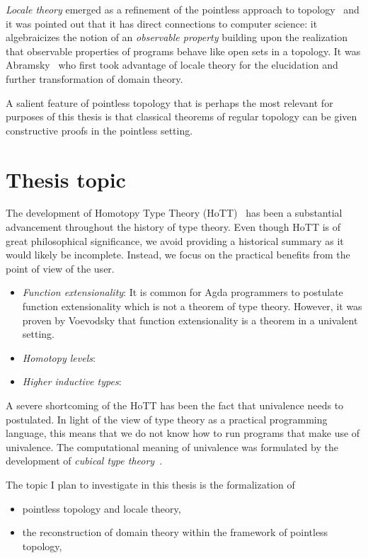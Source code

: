 \documentclass[11pt]{article}
\begin{document}
\emph{Locale theory} emerged as a refinement of the pointless approach to topology~\cite{%
johnstone:1982} and it was pointed out that it has direct connections to computer
science: it algebraicizes the notion of an \emph{observable property} building upon the
realization that observable properties of programs behave like open sets in a topology. It
was Abramsky~\cite{abramsky:1991} who first took advantage of locale theory for the
elucidation and further transformation of domain theory.

A salient feature of pointless topology that is perhaps the most relevant for purposes of
this thesis is that classical theorems of regular topology can be given constructive
proofs in the pointless setting.

\section{Thesis topic}

The development of Homotopy Type Theory (HoTT)~\cite{hottbook} has been a substantial
advancement throughout the history of type theory. Even though HoTT is of great
philosophical significance, we avoid providing a historical summary as it would likely be
incomplete. Instead, we focus on the practical benefits from the point of view of the
user.

\begin{itemize}
  \item \emph{Function extensionality}: It is common for Agda programmers to postulate
    function extensionality which is not a theorem of type theory. However, it was proven
    by Voevodsky that function extensionality is a theorem in a univalent setting.
  \item \emph{Homotopy levels}:
  \item \emph{Higher inductive types}:
\end{itemize}

A severe shortcoming of the HoTT has been the fact that univalence needs to postulated. In
light of the view of type theory as a practical programming language, this means that we
do not know how to run programs that make use of univalence. The computational meaning of
univalence was formulated by the development of \emph{cubical type theory}~\cite{cubicaltt}.

The topic I plan to investigate in this thesis is the formalization of

\begin{itemize}
  \item pointless topology and locale theory,
  \item the reconstruction of domain theory within the framework of pointless topology,
\end{itemize}
\end{document}
